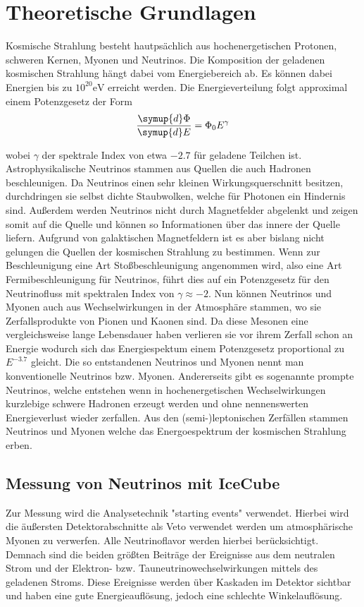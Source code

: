\section{Theoretische Grundlagen}
\label{sec:theorie}
Kosmische Strahlung besteht hautps\"achlich aus hochenergetischen Protonen, schweren Kernen, Myonen und Neutrinos. Die Komposition der geladenen kosmischen Strahlung h\"angt dabei vom Energiebereich ab. Es k\"onnen dabei Energien bis zu $10^{20} \si{\electronvolt}$ erreicht werden. Die Energieverteilung folgt approximal einem Potenzgesetz der Form
\begin{equation*}
  \frac{\symup{d}\Phi}{\symup{d}E} = \Phi_0 E^{\gamma}
\end{equation*}

wobei $\gamma$ der spektrale Index von etwa $-2.7$ f\"ur geladene Teilchen ist.
Astrophysikalische Neutrinos stammen aus Quellen die auch Hadronen beschleunigen. Da Neutrinos einen sehr kleinen Wirkungsquerschnitt besitzen, durchdringen sie selbst dichte Staubwolken, welche f\"ur Photonen ein Hindernis sind. Au\ss erdem werden Neutrinos nicht durch Magnetfelder abgelenkt und zeigen somit auf die Quelle und k\"onnen so Informationen \"uber das innere der Quelle liefern.
Aufgrund von galaktischen Magnetfeldern ist es aber bislang nicht gelungen die Quellen der kosmischen Strahlung zu bestimmen.
Wenn zur Beschleunigung eine Art Sto\ss beschleunigung angenommen wird, also eine Art Fermibeschleunigung f\"ur Neutrinos, f\"uhrt dies auf ein Potenzgesetz f\"ur den Neutrinofluss mit spektralen Index von $\gamma \approx -2$.
Nun k\"onnen Neutrinos und Myonen auch aus Wechselwirkungen in der Atmosph\"are stammen, wo sie Zerfallsprodukte von Pionen und Kaonen sind. Da diese Mesonen eine vergleichsweise lange Lebensdauer haben verlieren sie vor ihrem Zerfall schon an Energie wodurch sich das Energiespektum einem Potenzgesetz proportional zu $E^{-3.7}$ gleicht. Die so entstandenen Neutrinos und Myonen nennt man konventionelle Neutrinos bzw. Myonen.
Andererseits gibt es sogenannte prompte Neutrinos, welche entstehen wenn in hochenergetischen Wechselwirkungen kurzlebige schwere Hadronen erzeugt werden und ohne nennenswerten Energieverlust wieder zerfallen. Aus den (semi-)leptonischen Zerf\"allen stammen Neutrinos und Myonen welche das  Energoespektrum der kosmischen Strahlung erben.

\subsection{Messung von Neutrinos mit IceCube}
Zur Messung wird die Analysetechnik "starting events" verwendet. Hierbei wird die \"au\ss ersten Detektorabschnitte als Veto verwendet werden um atmosph\"arische Myonen zu verwerfen.
Alle Neutrinoflavor werden hierbei ber\"ucksichtigt. Demnach sind die beiden gr\"o\ss ten Beitr\"age der Ereignisse aus dem neutralen Strom und der Elektron- bzw. Tauneutrinowechselwirkungen mittels des geladenen Stroms. Diese Ereignisse werden \"uber Kaskaden im Detektor sichtbar und haben eine gute Energieaufl\"osung, jedoch eine schlechte Winkelaufl\"osung.


